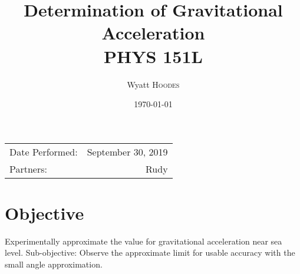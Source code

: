 \documentclass{article}
\title{Determination of Gravitational Acceleration \\ PHYS 151L} %
\author{Wyatt \textsc{Hoodes}} %
\date{\today} %
\begin{document}
\maketitle %

\begin{center}
\begin{tabular}{l r}
Date Performed: & September 30, 2019 \\ %
Partners: & Rudy \\ %
\end{tabular}
\end{center}



\section{Objective}

Experimentally approximate the value for gravitational acceleration near sea level.  Sub-objective:
Observe the approximate limit for usable accuracy with the small angle approximation.




\end{document}
